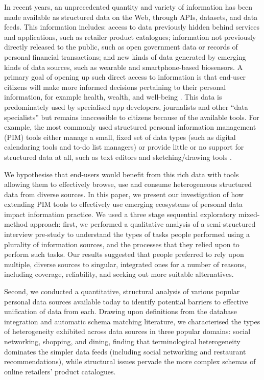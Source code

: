 \documentclass{sigchi}
\begin{document}
In recent years, an unprecedented quantity and variety of information has been made available as structured data on the Web, through APIs, datasets, and data feeds.  This information includes: access to data previously hidden behind services and applications, such as retailer product catalogues; information not previously directly released to the public, such as open government data or records of personal financial transactions; and new kinds of data generated by emerging kinds of data sources, such as wearable and smartphone-based biosensors.  A primary goal of opening up such direct access to information is that end-user citizens will make more informed decisions pertaining to their personal information, for example health, wealth, and well-being \cite{}.  This data is predominately used by  specialised app developers, journalists and other ``data specialists'' but remains inaccessible to citizens because of the available tools.  For example, the most commonly used structured personal information management (PIM) tools either manage a small, fixed set of data types (such as digital calendaring tools and  to-do list managers) or provide little or no support for structured data at all, such as text editors and sketching/drawing tools \cite{}.   

We hypothesise that end-users would benefit from this rich data with tools allowing them to effectively browse, use and consume heterogeneous structured data from diverse sources.  In this paper, we present our investigation of how extending PIM tools to effectively use emerging ecosystems of personal data impact information practice.  We used a three stage sequential exploratory mixed-method approach: first, we performed a qualitative analysis of a semi-structured interview pre-study to understand the types of tasks people performed using a plurality of  information sources, and the processes that they relied upon to perform such tasks.  Our results suggested that people preferred to rely upon multiple, diverse sources to singular, integrated ones for a number of reasons, including coverage, reliability, and seeking out more suitable alternatives.  

Second, we conducted a quantitative, structural analysis of various popular personal data sources available today to identify potential barriers to effective unification of data from each.  Drawing upon definitions from the database integration and automatic schema matching literature, we characterised the types of heterogeneity exhibited across data sources in three popular domains: social networking, shopping, and dining, finding that terminological heterogeneity dominates the simpler data feeds (including social networking and restaurant recommendations), while structural issues pervade the more complex schemas of online retailers' product catalogues.
\end{document}
